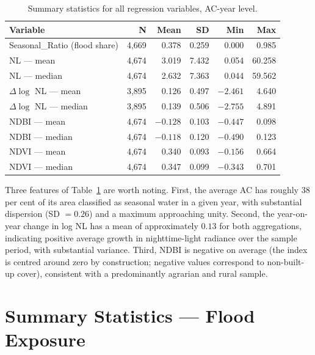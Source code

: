 \documentclass[12pt,a4paper,oneside]{report}
\begin{document}
\begin{table}[h]
\centering
\caption{Summary statistics for all regression variables, AC-year level.}
\label{tab:sumstats}
\begin{tabular}{lrrrrr}
\toprule
\textbf{Variable} & \textbf{N} & \textbf{Mean} & \textbf{SD} & \textbf{Min} & \textbf{Max} \\
\midrule
Seasonal\_Ratio (flood share)        & 4{,}669 & 0.378  & 0.259  & 0.000   & 0.985 \\
NL --- mean                          & 4{,}674 & 3.019  & 7.432  & 0.054   & 60.258 \\
NL --- median                        & 4{,}674 & 2.632  & 7.363  & 0.044   & 59.562 \\
$\Delta \log$ NL --- mean             & 3{,}895 & 0.126  & 0.497  & $-2.461$ & 4.640 \\
$\Delta \log$ NL --- median           & 3{,}895 & 0.139  & 0.506  & $-2.755$ & 4.891 \\
NDBI --- mean                        & 4{,}674 & $-0.128$ & 0.103 & $-0.447$ & 0.098 \\
NDBI --- median                      & 4{,}674 & $-0.118$ & 0.120 & $-0.490$ & 0.123 \\
NDVI --- mean                        & 4{,}674 & 0.340  & 0.093  & $-0.156$ & 0.664 \\
NDVI --- median                      & 4{,}674 & 0.347  & 0.099  & $-0.343$ & 0.701 \\
\bottomrule
\end{tabular}
\end{table}

Three features of Table~\ref{tab:sumstats} are worth noting. First, the average AC has roughly 38 per cent of its area classified as seasonal water in a given year, with substantial dispersion (SD $= 0.26$) and a maximum approaching unity. Second, the year-on-year change in log NL has a mean of approximately $0.13$ for both aggregations, indicating positive average growth in nighttime-light radiance over the sample period, with substantial variance. Third, NDBI is negative on average (the index is centred around zero by construction; negative values correspond to non-built-up cover), consistent with a predominantly agrarian and rural sample.

\section{Summary Statistics --- Flood Exposure}
\end{document}
